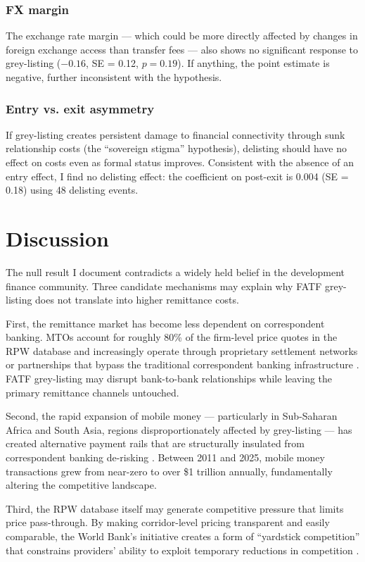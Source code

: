 \documentclass[12pt]{article}
\begin{document}
\subsubsection*{FX margin} The exchange rate margin --- which could be more directly affected by changes in foreign exchange access than transfer fees --- also shows no significant response to grey-listing ($-0.16$, SE = 0.12, $p = 0.19$). If anything, the point estimate is negative, further inconsistent with the hypothesis.

\subsubsection*{Entry vs. exit asymmetry} If grey-listing creates persistent damage to financial connectivity through sunk relationship costs (the ``sovereign stigma'' hypothesis), delisting should have no effect on costs even as formal status improves. Consistent with the absence of an entry effect, I find no delisting effect: the coefficient on post-exit is 0.004 (SE = 0.18) using 48 delisting events.


\section{Discussion}

The null result I document contradicts a widely held belief in the development finance community. Three candidate mechanisms may explain why FATF grey-listing does not translate into higher remittance costs.

First, the remittance market has become less dependent on correspondent banking. MTOs account for roughly 80\% of the firm-level price quotes in the RPW database and increasingly operate through proprietary settlement networks or partnerships that bypass the traditional correspondent banking infrastructure \citep{worldbank2024}. FATF grey-listing may disrupt bank-to-bank relationships while leaving the primary remittance channels untouched.

Second, the rapid expansion of mobile money --- particularly in Sub-Saharan Africa and South Asia, regions disproportionately affected by grey-listing --- has created alternative payment rails that are structurally insulated from correspondent banking de-risking \citep{gsma2023}. Between 2011 and 2025, mobile money transactions grew from near-zero to over \$1 trillion annually, fundamentally altering the competitive landscape.

Third, the RPW database itself may generate competitive pressure that limits price pass-through. By making corridor-level pricing transparent and easily comparable, the World Bank's initiative creates a form of ``yardstick competition'' that constrains providers' ability to exploit temporary reductions in competition \citep{beck2018}.
\end{document}
